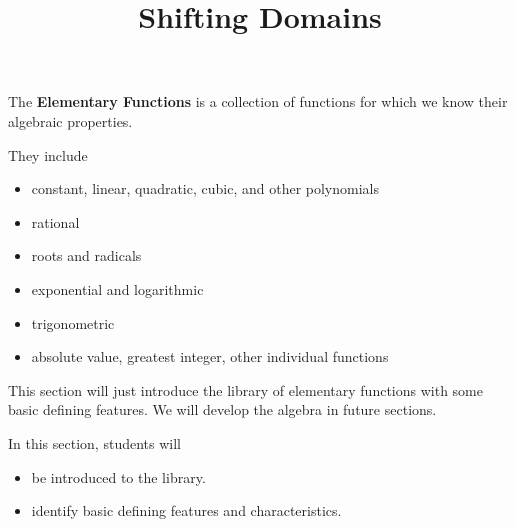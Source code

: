 \documentclass{ximera}
\title{Shifting Domains}
\begin{document}
\begin{abstract}
\end{abstract}
\maketitle




The \textbf{Elementary Functions} is a collection of functions for which we know their algebraic properties.

They include 

\begin{itemize}
\item constant, linear, quadratic, cubic, and other polynomials
\item rational
\item roots and radicals
\item exponential and logarithmic
\item trigonometric
\item absolute value, greatest integer, other individual functions
\end{itemize}



This section will just introduce the library of elementary functions with some basic defining features.  We will develop the algebra in future sections.














\begin{sectionOutcomes}
In this section, students will 

\begin{itemize}
\item be introduced to the library.
\item identify basic defining features and characteristics.
\end{itemize}
\end{sectionOutcomes}
\end{document}
